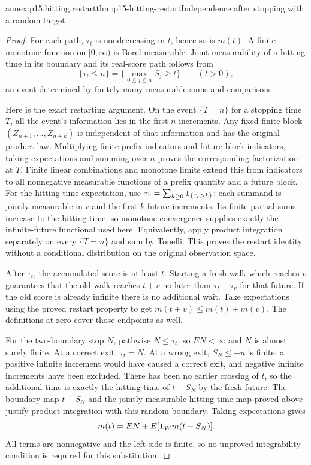 \begin{annexitem}{annex:p15.hitting.restart}{thm:p15-hitting-restart}{Independence after stopping with a random target}
\begin{proof}
For each path, \(\tau_t\) is nondecreasing in \(t\), hence so is \(m(t)\).
A finite monotone function on \([0,\infty)\) is Borel measurable.
Joint measurability of a hitting time in its boundary and its real-score
path follows from
\[
 \{\tau_t\leq n\}=\{\max_{0\leq j\leq n}S_j\geq t\}
 \qquad(t>0),
\]
an event determined by finitely many measurable sums and comparisons.

Here is the exact restarting argument. On the event \(\{T=n\}\)
for a stopping time \(T\), all the event's information lies in the
first \(n\) increments. Any fixed finite block
\((Z_{n+1},\ldots,Z_{n+k})\) is independent of that information and
has the original product law. Multiplying finite-prefix indicators
and future-block indicators, taking expectations and summing over
\(n\) proves the corresponding factorization at \(T\).
Finite linear combinations and monotone limits extend this from
indicators to all nonnegative measurable functions of a prefix
quantity and a future block. For the hitting-time expectation, use
\(\tau_r=\sum_{k\geq0}{\bf1}_{\{\tau_r>k\}}\): each summand is
jointly measurable in \(r\) and the first \(k\) future increments.
Its finite partial sums increase to the hitting time, so monotone
convergence supplies exactly the infinite-future functional used here.
Equivalently, apply product integration separately on every
\(\{T=n\}\) and sum by Tonelli.
This proves the restart identity without a conditional distribution
on the original observation space.

After \(\tau_t\), the accumulated score is at least \(t\).
Starting a fresh walk which reaches \(v\) guarantees that the old
walk reaches \(t+v\) no later than \(\tau_t+\tau_v\) for that future.
If the old score is already infinite there is no additional wait.
Take expectations using the proved restart property to get
\(m(t+v)\leq m(t)+m(v)\). The definitions at zero cover those
endpoints as well.

For the two-boundary stop \(N\), pathwise \(N\leq\tau_t\), so
\(EN<\infty\) and \(N\) is almost surely finite.
At a correct exit, \(\tau_t=N\).
At a wrong exit, \(S_N\leq-u\) is finite: a positive infinite
increment would have caused a correct exit, and negative infinite
increments have been excluded.
There has been no earlier crossing of \(t\), so the additional
time is exactly the hitting time of \(t-S_N\) by the fresh future.
The boundary map \(t-S_N\) and the jointly measurable hitting-time
map proved above justify product integration with this random boundary.
Taking expectations gives
\[
 m(t)=EN+E[{\bf1}_Wm(t-S_N)].
\]
All terms are nonnegative and the left side is finite, so no
unproved integrability condition is required for this substitution.
\end{proof}
\end{annexitem}

